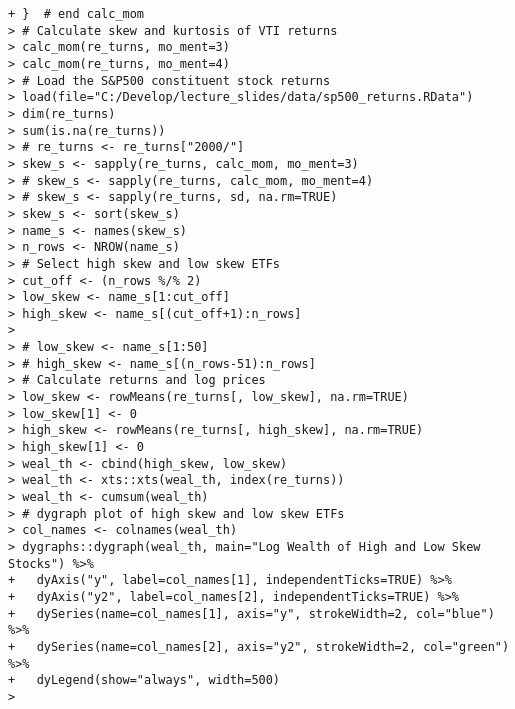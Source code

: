 \documentclass[10pt]{beamer}\usepackage[]{graphicx}\usepackage[]{color}
\makeatletter
\newenvironment{kframe}{%
 \def\at@end@of@kframe{}%
 \ifinner\ifhmode%
  \def\at@end@of@kframe{\end{minipage}}%
  \begin{minipage}{\columnwidth}%
 \fi\fi%
 \def\FrameCommand##1{\hskip\@totalleftmargin \hskip-\fboxsep
 \colorbox{shadecolor}{##1}\hskip-\fboxsep
     \hskip-\linewidth \hskip-\@totalleftmargin \hskip\columnwidth}%
 \MakeFramed {\advance\hsize-\width
   \@totalleftmargin\z@ \linewidth\hsize
   \@setminipage}}%
 {\par\unskip\endMakeFramed%
 \at@end@of@kframe}
\newenvironment{knitrout}{}{} %
\makeatother
\begin{document}
\begin{frame}[fragile,t]{\subsecname}
\begin{block}{}
\begin{columns}[T]
\begin{knitrout}
\begin{kframe}
\begin{verbatim}
+ }  # end calc_mom
> # Calculate skew and kurtosis of VTI returns
> calc_mom(re_turns, mo_ment=3)
> calc_mom(re_turns, mo_ment=4)
> # Load the S&P500 constituent stock returns
> load(file="C:/Develop/lecture_slides/data/sp500_returns.RData")
> dim(re_turns)
> sum(is.na(re_turns))
> # re_turns <- re_turns["2000/"]
> skew_s <- sapply(re_turns, calc_mom, mo_ment=3)
> # skew_s <- sapply(re_turns, calc_mom, mo_ment=4)
> # skew_s <- sapply(re_turns, sd, na.rm=TRUE)
> skew_s <- sort(skew_s)
> name_s <- names(skew_s)
> n_rows <- NROW(name_s)
> # Select high skew and low skew ETFs
> cut_off <- (n_rows %/% 2)
> low_skew <- name_s[1:cut_off]
> high_skew <- name_s[(cut_off+1):n_rows]
> 
> # low_skew <- name_s[1:50]
> # high_skew <- name_s[(n_rows-51):n_rows]
> # Calculate returns and log prices
> low_skew <- rowMeans(re_turns[, low_skew], na.rm=TRUE)
> low_skew[1] <- 0
> high_skew <- rowMeans(re_turns[, high_skew], na.rm=TRUE)
> high_skew[1] <- 0
> weal_th <- cbind(high_skew, low_skew)
> weal_th <- xts::xts(weal_th, index(re_turns))
> weal_th <- cumsum(weal_th)
> # dygraph plot of high skew and low skew ETFs
> col_names <- colnames(weal_th)
> dygraphs::dygraph(weal_th, main="Log Wealth of High and Low Skew Stocks") %>%
+   dyAxis("y", label=col_names[1], independentTicks=TRUE) %>%
+   dyAxis("y2", label=col_names[2], independentTicks=TRUE) %>%
+   dySeries(name=col_names[1], axis="y", strokeWidth=2, col="blue") %>%
+   dySeries(name=col_names[2], axis="y2", strokeWidth=2, col="green") %>%
+   dyLegend(show="always", width=500)
> 
\end{verbatim}
\end{kframe}
\end{knitrout}
  \end{columns}
\end{block}

\end{frame}


\end{document}

